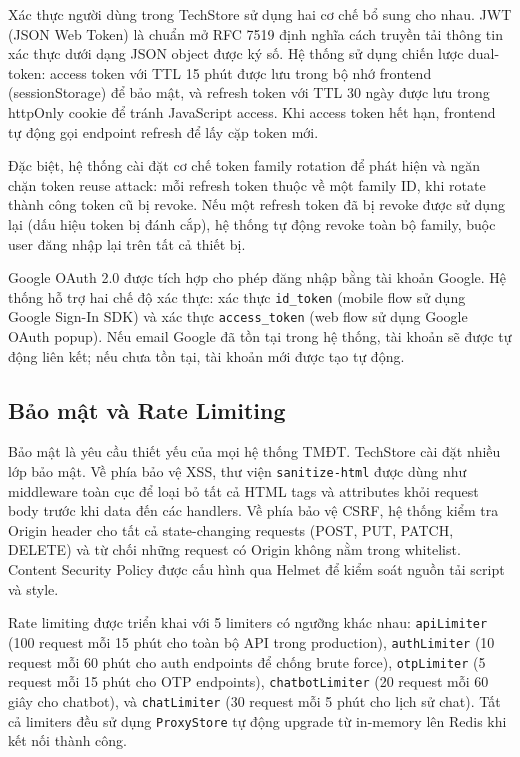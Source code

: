 Xác thực người dùng trong TechStore sử dụng hai cơ chế bổ sung cho nhau. JWT (JSON Web Token) \cite{jones2015jwt} là chuẩn mở RFC 7519 định nghĩa cách truyền tải thông tin xác thực dưới dạng JSON object được ký số. Hệ thống sử dụng chiến lược dual-token: access token với TTL 15 phút được lưu trong bộ nhớ frontend (sessionStorage) để bảo mật, và refresh token với TTL 30 ngày được lưu trong httpOnly cookie để tránh JavaScript access. Khi access token hết hạn, frontend tự động gọi endpoint refresh để lấy cặp token mới.

Đặc biệt, hệ thống cài đặt cơ chế token family rotation để phát hiện và ngăn chặn token reuse attack: mỗi refresh token thuộc về một family ID, khi rotate thành công token cũ bị revoke. Nếu một refresh token đã bị revoke được sử dụng lại (dấu hiệu token bị đánh cắp), hệ thống tự động revoke toàn bộ family, buộc user đăng nhập lại trên tất cả thiết bị.

Google OAuth 2.0 được tích hợp cho phép đăng nhập bằng tài khoản Google. Hệ thống hỗ trợ hai chế độ xác thực: xác thực \texttt{id\_token} (mobile flow sử dụng Google Sign-In SDK) và xác thực \texttt{access\_token} (web flow sử dụng Google OAuth popup). Nếu email Google đã tồn tại trong hệ thống, tài khoản sẽ được tự động liên kết; nếu chưa tồn tại, tài khoản mới được tạo tự động.

\subsection{Bảo mật và Rate Limiting}

Bảo mật là yêu cầu thiết yếu của mọi hệ thống TMĐT. TechStore cài đặt nhiều lớp bảo mật. Về phía bảo vệ XSS, thư viện \texttt{sanitize-html} được dùng như middleware toàn cục để loại bỏ tất cả HTML tags và attributes khỏi request body trước khi data đến các handlers. Về phía bảo vệ CSRF, hệ thống kiểm tra Origin header cho tất cả state-changing requests (POST, PUT, PATCH, DELETE) và từ chối những request có Origin không nằm trong whitelist. Content Security Policy được cấu hình qua Helmet để kiểm soát nguồn tải script và style.

Rate limiting được triển khai với 5 limiters có ngưỡng khác nhau: \texttt{apiLimiter} (100 request mỗi 15 phút cho toàn bộ API trong production), \texttt{authLimiter} (10 request mỗi 60 phút cho auth endpoints để chống brute force), \texttt{otpLimiter} (5 request mỗi 15 phút cho OTP endpoints), \texttt{chatbotLimiter} (20 request mỗi 60 giây cho chatbot), và \texttt{chatLimiter} (30 request mỗi 5 phút cho lịch sử chat). Tất cả limiters đều sử dụng \texttt{ProxyStore} tự động upgrade từ in-memory lên Redis khi kết nối thành công.

